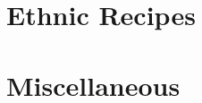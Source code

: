 \documentclass[letterpaper, 12pt]{memoir} %
\begin{document}










\part{Ethnic Recipes}








\part{Miscellaneous}


\printindex
\end{document}
